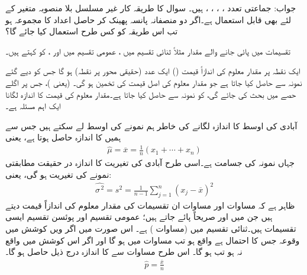 جواب:\quad
جماعتی تعدد ، ، ، ،  ہیں۔
\quad
سوال  کا طریقہ کار غیر مسلسل بلا منصوبہ متغیر کے لئے  بھی قابل استعمال ہے۔اگر دو منصفانہ پانسہ پھینک کر حاصل اعداد کا مجموعہ  ہو تب اس طریقہ کو کس طرح استعمال کیا جائے گا؟

تقسیمات میں پائی جانے والے مقدار مثلاً ثنائی تقسیم میں ، عمومی تقسیم میں  اور ، کو  کہتے ہیں۔

ایک نقطہ پر مقدار معلوم کی اندازاً قیمت ()  ایک عدد (حقیقی محور پر نقطہ) ہو گا جس کو دیے گئے نمونہ سے حاصل کیا جاتا ہے جو مقدار معلوم کی اصل قیمت کی تخمین ہو گی۔  (یعنی )، جس پر اگلے حصے میں بحث کی جائے گی،  کو نمونہ سے حاصل کیا جاتا ہے۔مقدار معلوم کی قیمت کا اندازہ لگانا ایک اہم مسئلہ ہے۔

آبادی کی اوسط   کا اندازہ لگانے کی خاطر ہم نمونے کی اوسط  لے سکتے ہیں جس سے ہمیں  کا اندازہ   حاصل ہوتا ہے، یعنی
\begin{align}\label{مساوات_شماریات_اندازہ_الف}
\widehat{\mu}=\overline{x}=\frac{1}{n}(x_1+\cdots+x_n)
\end{align}
جہاں نمونہ کی جسامت  ہے۔اسی طرح آبادی کی تغیریت کا اندازہ  در حقیقت مطابقتی نمونے کی تغیریت  ہو گی، یعنی:
\begin{align}\label{مساوات_شماریات_اندازہ_ب}
\widehat{\sigma^{\,2}}=s^2=\frac{1}{n-1}\sum_{j=1}^{n} (x_j-\overline{x})^2
\end{align}   
ظاہر ہے کہ مساوات  اور مساوات   ان تقسیمات کی مقدار معلوم کی اندازاً قیمت دیتے ہیں جن میں  اور  صریحاً پائے جاتے ہیں؛ عمومی تقسیم اور پوئسن تقسیم ایسی تقسیمات ہیں۔ثنائی تقسیم میں  (مساوات ) ہے۔ اس صورت میں  اگر  ویں کوشش میں وقوعہ  جس کا احتمال  ہے واقع ہو تب مساوات  میں  ہو گا اور اگر اس کوشش میں  واقع نہ ہو تب   ہو گا۔ اس طرح مساوات  سے  کا اندازہ درج ذیل حاصل ہو گا۔
\begin{align}
\widehat{p}=\frac{\overline{x}}{n}
\end{align}

